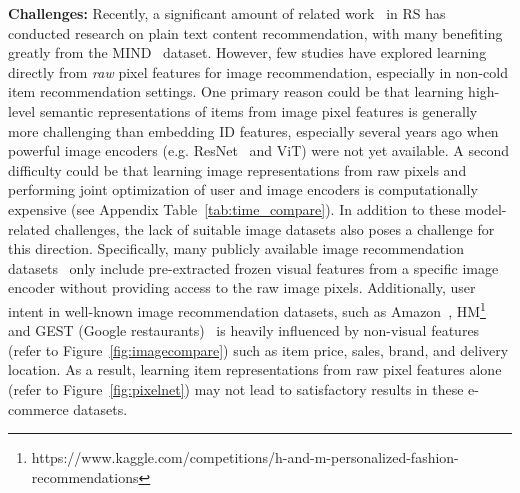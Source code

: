 \documentclass[sigconf]{acmart}
\begin{document}
\textbf{Challenges:} 
Recently,	a significant amount of related work~\cite{wu2021empowering, hou2022learning,geng2022recommendation,lu2021less} in RS  has conducted research on plain text content recommendation, with many benefiting greatly from the MIND~\cite{wu2020mind} dataset. However,  
few studies have explored learning directly from \textit{raw} pixel features for image recommendation, especially in non-cold item recommendation settings.
One primary reason could be that learning high-level semantic representations of items  from image pixel features is generally more challenging than embedding ID features, especially  several years ago when powerful image encoders (e.g. ResNet~\cite{he2016deep} and ViT) were not yet available.
A second difficulty could be that learning image representations from raw pixels and performing joint optimization of  user and image encoders  is computationally expensive (see Appendix Table~\ref{tab:time_compare}).
In addition to these model-related challenges, the lack of suitable image datasets also poses a challenge for this direction. Specifically,  many publicly available  image recommendation datasets~\cite{he2016vista,wu2019hierarchical}  only include pre-extracted frozen visual features from a specific image encoder without providing access to the raw image pixels. Additionally, user intent in well-known image recommendation datasets, such as  Amazon~\cite{mcauley2015image}, HM\footnote{https://www.kaggle.com/competitions/h-and-m-personalized-fashion-recommendations} and GEST (Google restaurants)~\cite{yan2022personalized} is heavily influenced by non-visual features (refer to Figure~\ref{fig:imagecompare})  such as item price, sales, brand, and delivery location. As a result, learning item representations  from raw pixel features alone (refer to Figure~\ref{fig:pixelnet}) may not lead to satisfactory results in these e-commerce datasets. 
	
\end{document}
